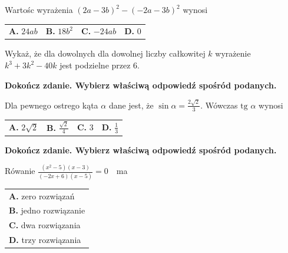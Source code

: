 \documentclass[12pt,a4paper]{article}
\theoremstyle{break}
\begin{document}
	Wartośc wyrażenia $(2a-3b)^2-(-2a-3b)^2$ wynosi
	
	\vspace{0.5cm}
	\begin{tabular}{p{3.5cm} p{3.5cm} p{3.5cm} p{3.5cm}}
		\textbf{A. }$24ab$&
		\textbf{B. }$18b^2$&
		\textbf{C. }$-24ab$&
		\textbf{D. }$0$\\
	\end{tabular}


	\begin{zad}[0-2]
		Wykaż, że dla dowolnych dla dowolnej liczby całkowitej $k$ wyrażenie $k^3+3k^2-40k$ jest podzielne przez 6.
	\end{zad} 

	
	\begin{zad}[0-1]
		\textbf{Dokończ zdanie. Wybierz właściwą odpowiedź spośród podanych.}
	\end{zad} 
	
	Dla pewnego ostrego kąta $\alpha$ dane jest, że $\sin\alpha = \frac{2\sqrt{2}}{3}$. Wówczas $\text{tg }\alpha$ wynosi
	
	\vspace{0.5cm}
	\begin{tabular}{p{3.5cm} p{3.5cm} p{3.5cm} p{3.5cm}}
		\textbf{A. }$2\sqrt{2}$&
		\textbf{B. }$\frac{\sqrt{2}}{4}$&
		\textbf{C. }$3$&
		\textbf{D. }$\frac{1}{3}$\\
	\end{tabular}

	\newpage
	\begin{zad}[0-1]
		\textbf{Dokończ zdanie. Wybierz właściwą odpowiedź spośród podanych.}
	\end{zad} 
	
	Rówanie \large$\frac{(x^2-5)(x-3)}{(-2x+6)(x-5)}$$=0\quad$\normalsize ma 
	
	\vspace{0.5cm}
	\begin{tabular}{p{14cm}}
		\textbf{A. }zero rozwiązań\\
		\textbf{B. }jedno rozwiązanie\\
		\textbf{C. }dwa rozwiązania\\
		\textbf{D. }trzy rozwiązania\\
	\end{tabular}

	
\end{document}

